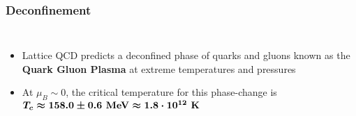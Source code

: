\begin{frame}
  \frametitle{\textbf{Deconfinement}}
  \begin{columns}
    \begin{itemize}
    \item Lattice QCD predicts a deconfined phase of quarks and gluons known as the \textbf{Quark Gluon Plasma} at extreme temperatures and pressures
    \item At $\mu_B \sim 0$, the critical temperature for this phase-change is $\boldmath{T_c \approx 158.0 \pm 0.6 \textbf{ MeV} \approx 1.8 \cdot 10^{12} \textbf{ K}}$
    \end{itemize}
  \end{columns}
\end{frame}
